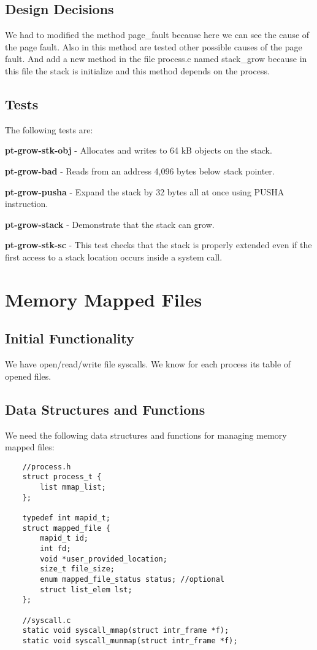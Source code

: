 \subsection{Design Decisions}

We had to modified the method page\_fault because here we can see the cause of the page fault. Also in this method are tested other possible causes of the page fault. And add a new method in the file process.c named stack\_grow because in this file the stack is initialize and this method depends on the process.


\subsection{Tests}

The following tests are: 

\textbf{pt-grow-stk-obj} - Allocates and writes to 64 kB objects on the stack. 

\textbf{pt-grow-bad} - Reads from an address 4,096 bytes below stack pointer. 

\textbf{pt-grow-pusha} - Expand the stack by 32 bytes all at once using PUSHA instruction. 

\textbf{pt-grow-stack} - Demonstrate that the stack can grow. 

\textbf{pt-grow-stk-sc} - This test checks that the stack is properly extended even if the first access to a stack location occurs inside a system call. 



\section{Memory Mapped Files}
\subsection{Initial Functionality}

We have open/read/write file syscalls. We know for each process its table of opened files.


\subsection{Data Structures and Functions}

We need the following data structures and functions for managing memory mapped files: 

\begin{lstlisting}
	//process.h
	struct process_t {
		list mmap_list;
	};

	typedef int mapid_t;
	struct mapped_file {
		mapid_t id;
		int fd;
		void *user_provided_location;
		size_t file_size;
		enum mapped_file_status status; //optional
		struct list_elem lst;
	};

	//syscall.c
	static void syscall_mmap(struct intr_frame *f);
	static void syscall_munmap(struct intr_frame *f);
\end{lstlisting}
	



